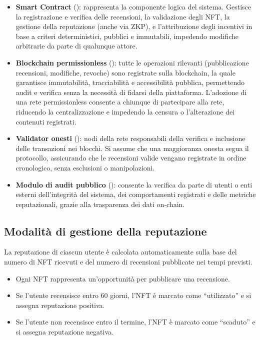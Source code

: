 \begin{itemize}
                \item \textbf{Smart Contract} (\faFileCode): rappresenta la componente logica del sistema. Gestisce la registrazione e verifica delle recensioni, la validazione degli NFT, la gestione della reputazione (anche via ZKP), e l'attribuzione degli incentivi in base a criteri deterministici, pubblici e immutabili, impedendo modifiche arbitrarie da parte di qualunque attore.
            
                \item \textbf{Blockchain permissionless} (\faCubes): tutte le operazioni rilevanti (pubblicazione recensioni, modifiche, revoche) sono registrate sulla blockchain, la quale garantisce immutabilità, tracciabilità e accessibilità pubblica, permettendo audit e verifica senza la necessità di fidarsi della piattaforma. L'adozione di una rete permissionless consente a chiunque di partecipare alla rete, riducendo la centralizzazione e impedendo la censura o l'alterazione dei contenuti registrati.
            
                \item \textbf{Validator onesti} (\faCube): nodi della rete responsabili della verifica e inclusione delle transazioni nei blocchi. Si assume che una maggioranza onesta segua il protocollo, assicurando che le recensioni valide vengano registrate in ordine cronologico, senza esclusioni o manipolazioni.
            
                \item \textbf{Modulo di audit pubblico} (\faEye): consente la verifica da parte di utenti o enti esterni dell'integrità del sistema, dei comportamenti registrati e delle metriche reputazionali, grazie alla trasparenza dei dati on-chain.
            \end{itemize}
        
        \subsection{Modalità di gestione della reputazione}
            La reputazione di ciascun utente è calcolata automaticamente sulla base del numero di NFT ricevuti e del numero di recensioni pubblicate nei tempi previsti.
            
                \begin{itemize}
                    \item Ogni NFT rappresenta un'opportunità per pubblicare una recensione.
                    
                    \item Se l'utente recensisce entro 60 giorni, l’NFT è marcato come “utilizzato” e si assegna reputazione positiva.
                    
                    \item Se l'utente non recensisce entro il termine, l’NFT è marcato come “scaduto” e si assegna reputazione negativa.
                \end{itemize}


